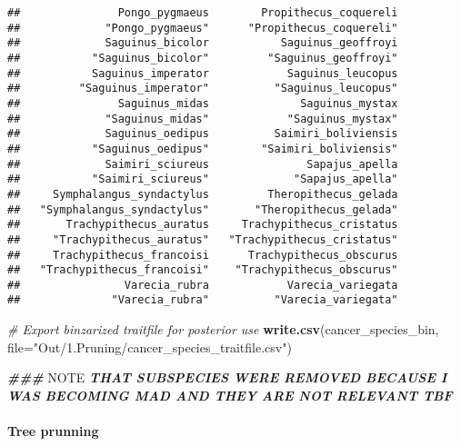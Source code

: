 \documentclass[
]{article}
\newenvironment{Shaded}{\begin{snugshade}}{\end{snugshade}}
\newcommand{\AlertTok}[1]{\textcolor[rgb]{0.94,0.16,0.16}{#1}}
\newcommand{\AttributeTok}[1]{\textcolor[rgb]{0.13,0.29,0.53}{#1}}
\newcommand{\CommentTok}[1]{\textcolor[rgb]{0.56,0.35,0.01}{\textit{#1}}}
\newcommand{\ConstantTok}[1]{\textcolor[rgb]{0.56,0.35,0.01}{#1}}
\newcommand{\DocumentationTok}[1]{\textcolor[rgb]{0.56,0.35,0.01}{\textbf{\textit{#1}}}}
\newcommand{\FunctionTok}[1]{\textcolor[rgb]{0.13,0.29,0.53}{\textbf{#1}}}
\newcommand{\NormalTok}[1]{#1}
\newcommand{\OtherTok}[1]{\textcolor[rgb]{0.56,0.35,0.01}{#1}}
\newcommand{\SpecialCharTok}[1]{\textcolor[rgb]{0.81,0.36,0.00}{\textbf{#1}}}
\newcommand{\StringTok}[1]{\textcolor[rgb]{0.31,0.60,0.02}{#1}}
\begin{document}
\begin{verbatim}
##               Pongo_pygmaeus        Propithecus_coquereli 
##             "Pongo_pygmaeus"      "Propithecus_coquereli" 
##             Saguinus_bicolor           Saguinus_geoffroyi 
##           "Saguinus_bicolor"         "Saguinus_geoffroyi" 
##           Saguinus_imperator            Saguinus_leucopus 
##         "Saguinus_imperator"          "Saguinus_leucopus" 
##               Saguinus_midas              Saguinus_mystax 
##             "Saguinus_midas"            "Saguinus_mystax" 
##             Saguinus_oedipus          Saimiri_boliviensis 
##           "Saguinus_oedipus"        "Saimiri_boliviensis" 
##             Saimiri_sciureus               Sapajus_apella 
##           "Saimiri_sciureus"             "Sapajus_apella" 
##     Symphalangus_syndactylus         Theropithecus_gelada 
##   "Symphalangus_syndactylus"       "Theropithecus_gelada" 
##       Trachypithecus_auratus     Trachypithecus_cristatus 
##     "Trachypithecus_auratus"   "Trachypithecus_cristatus" 
##     Trachypithecus_francoisi      Trachypithecus_obscurus 
##   "Trachypithecus_francoisi"    "Trachypithecus_obscurus" 
##                Varecia_rubra            Varecia_variegata 
##              "Varecia_rubra"          "Varecia_variegata"
\end{verbatim}

\begin{Shaded}
\begin{Highlighting}[]
\CommentTok{\# Export binzarized traitfile for posterior use}
\FunctionTok{write.csv}\NormalTok{(cancer\_species\_bin, }\AttributeTok{file=}\StringTok{"Out/1.Pruning/cancer\_species\_traitfile.csv"}\NormalTok{)}

\DocumentationTok{\#\#\# }\AlertTok{NOTE}\DocumentationTok{ THAT SUBSPECIES WERE REMOVED BECAUSE I WAS BECOMING MAD AND THEY ARE NOT RELEVANT TBF}
\end{Highlighting}
\end{Shaded}

\hypertarget{tree-prunning}{%
\paragraph{Tree prunning}\label{tree-prunning}}

\begin{Shaded}
\end{Shaded}
\end{document}
